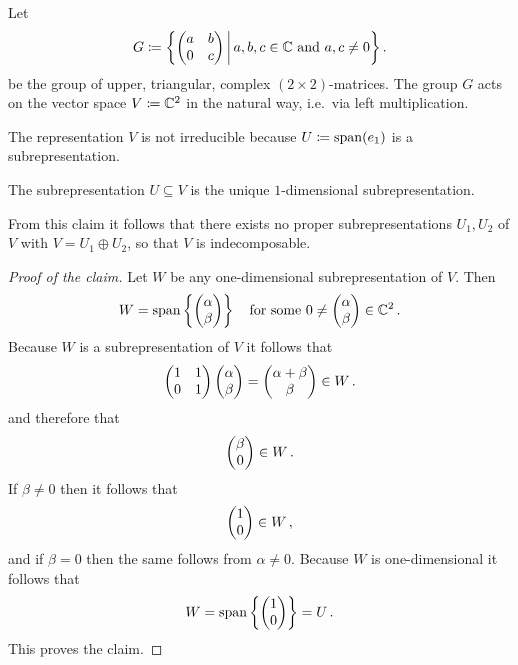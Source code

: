 \begin{example}
  \label{example: upper triangular action on C2}
  Let
  \[
              G
    \coloneqq \left\{
                \begin{pmatrix}
                  a & b \\
                  0 & c
                \end{pmatrix}
              \,\middle|\,
                a, b, c \in \mathbb{C}
                \text{ and }
                a, c \neq 0
              \right\} .
  \]
  be the group of upper, triangular, complex $(2 \times 2)$-matrices.
  The group $G$ acts on the vector space $V \coloneqq \mathbb{C}^2$ in the natural way, i.e.\ via left multiplication.
  
  The representation $V$ is not irreducible because $U \coloneqq \operatorname{span}(e_1)$ is a subrepresentation.
  \begin{claim}
    The subrepresentation $U \subseteq V$ is the unique $1$-dimensional subrepresentation.
  \end{claim}
  From this claim it follows that there exists no proper subrepresentations $U_1, U_2$ of $V$ with $V = U_1 \oplus U_2$, so that $V$ is indecomposable.
  \begin{proof}[Proof of the claim]
    Let $W$ be any one-dimensional subrepresentation of $V$.
    Then
    \[
        W
      = \operatorname{span}\left\{
                \begin{pmatrix}\alpha \\ \beta\end{pmatrix}
              \right\}
      \quad
      \text{for some $0 \neq  \begin{pmatrix}\alpha \\ \beta\end{pmatrix} \in   \mathbb{C}^2$} \,.
    \]
    Because $W$ is a subrepresentation of $V$ it follows that
    \[
          \begin{pmatrix}
            1 & 1 \\
            0 & 1
          \end{pmatrix}
          \begin{pmatrix}\alpha \\ \beta\end{pmatrix}
      =   \begin{pmatrix}\alpha + \beta \\ \beta\end{pmatrix}
      \in W \,.
    \]
    and therefore that
    \[
      \begin{pmatrix}\beta \\ 0\end{pmatrix} \in W \,.
    \]
    If $\beta \neq 0$ then it follows that
    \[
      \begin{pmatrix}1 \\ 0\end{pmatrix} \in W \,,
    \]
    and if $\beta = 0$ then the same follows from $\alpha \neq 0$.
    Because $W$ is one-dimensional it follows that
    \[
        W
      = \operatorname{span} \left\{ \begin{pmatrix}1 \\ 0\end{pmatrix} \right\}
      = U \,.
    \]
    This proves the claim.
  \end{proof}
\end{example}


